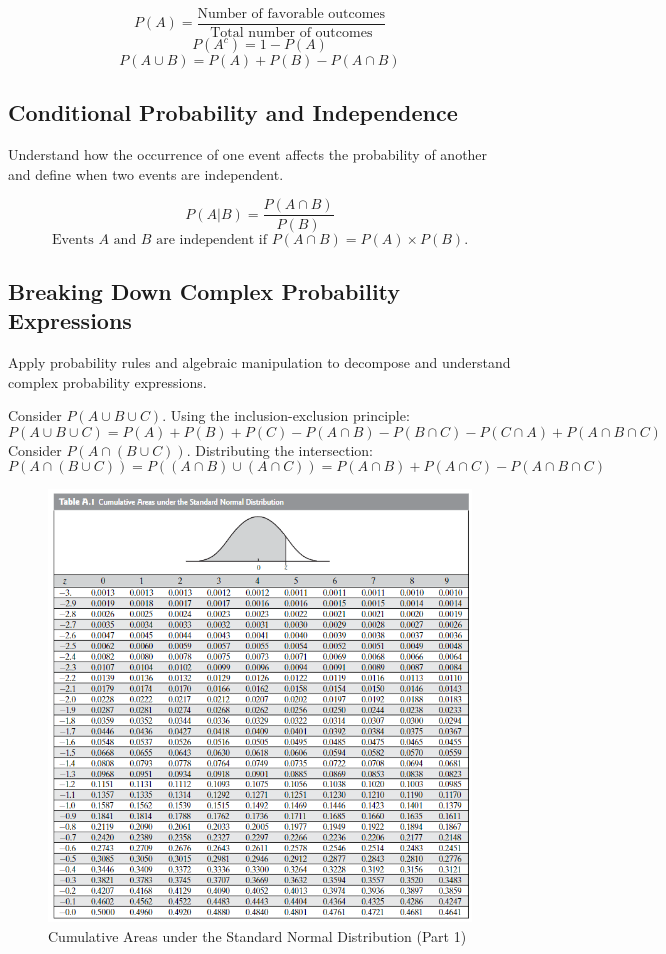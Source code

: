 \documentclass[12pt]{article}
\begin{document}
\[
P(A) = \frac{\text{Number of favorable outcomes}}{\text{Total number of outcomes}}
\]
\[
P(A^c) = 1 - P(A)
\]
\[
P(A \cup B) = P(A) + P(B) - P(A \cap B)
\]

\subsection*{Conditional Probability and Independence}
Understand how the occurrence of one event affects the probability of another and define when two events are independent.

\[
P(A | B) = \frac{P(A \cap B)}{P(B)}
\]
\[
\text{Events } A \text{ and } B \text{ are independent if } P(A \cap B) = P(A) \times P(B).
\]

\subsection*{Breaking Down Complex Probability Expressions}
Apply probability rules and algebraic manipulation to decompose and understand complex probability expressions.

Consider \( P(A \cup B \cup C) \). Using the inclusion-exclusion principle:
\[
P(A \cup B \cup C) = P(A) + P(B) + P(C) - P(A \cap B) - P(B \cap C) - P(C \cap A) + P(A \cap B \cap C)
\]
Consider \( P(A \cap (B \cup C)) \). Distributing the intersection:
\[
P(A \cap (B \cup C)) = P((A \cap B) \cup (A \cap C)) = P(A \cap B) + P(A \cap C) - P(A \cap B \cap C)
\]



\begin{figure}[ht]
  \centering
  \includegraphics[width=\textwidth]{images/z-table_1.png}
  \caption{Cumulative Areas under the Standard Normal Distribution (Part 1)}
\end{figure}
\end{document}
